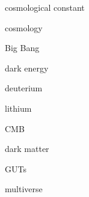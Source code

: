 \documentclass{article}
\begin{document}
\gls{cosmological constant}

\gls{cosmology}

\gls{Big Bang}

\gls{dark energy}

\gls{deuterium}

\gls{lithium}

\gls{CMB}

\gls{dark matter}

\gls{GUTs}

\gls{multiverse}

\clearpage

\printglossaries
\end{document}
